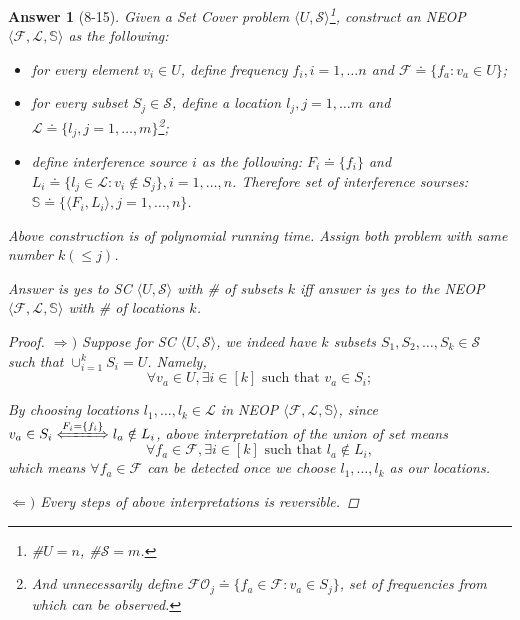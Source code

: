 \documentclass[11pt]{article}
\theoremstyle{numberplain}
\theoremstyle{nonumberplain}
\newtheorem{proof}{Proof}
\newtheorem{ans}{Answer}
\newcommand{\0}{{\mathbf{0}}}
\begin{document}
\begin{ans}[8-15] Given a Set Cover problem $\langle U, \mathcal{S}\rangle$\footnote{\#$U=n$, \#$\mathcal{S}=m$.}, construct an NEOP $\langle \mathcal{F}, \mathcal{L}, \mathbb{S}\rangle$ as the following:
\begin{itemize}
\item for every element $v_i\in U$, define frequency $f_i,i=1,\ldots n$ and $\mathcal{F}\doteq\{f_a:v_a\in U\}$; 
\item for every subset $S_j\in\mathcal{S}$, define a location $l_j,j=1,\ldots m$ and $\mathcal{L}\doteq \{l_j,j=1,\ldots, m \}$\footnote{And unnecessarily define $\mathcal{FO}_j\doteq\{ f_a\in \mathcal{F}:v_a\in S_j\}$, set of frequencies from which can be observed.};
\item define interference source $i$ as the following: $F_i\doteq \{f_i\}$ and $L_i\doteq\{l_j\in \mathcal{L}: v_i\notin S_j \}, i=1,\ldots, n$. Therefore set of interference sourses: $\mathbb{S}\doteq \{\langle F_i,L_i\rangle, j=1,\ldots, n\}$.
\end{itemize}
Above construction is of polynomial running time. Assign both problem with same number $k(\leq j)$.
\begin{State}[Claim 1] Answer is yes to SC $\langle U, \mathcal{S}\rangle$ with  \# of subsets $k$ iff answer is yes to the NEOP $\langle \mathcal{F}, \mathcal{L}, \mathbb{S}\rangle$ with \# of locations $k$.
\end{State}
\begin{proof}
$\Rightarrow )$ Suppose for SC $\langle U, \mathcal{S}\rangle$, we indeed have $k$ subsets $S_1,S_2,\ldots,S_k\in \mathcal{S}$ such that $\cup_{i=1}^k S_i=U$. Namely, 
$$\forall v_a\in U, \exists i\in [k]\text{ such that }v_a\in S_i;$$

By choosing locations $l_1,\ldots,l_k\in \mathcal{L}$ in  NEOP $\langle \mathcal{F}, \mathcal{L}, \mathbb{S}\rangle$, since $v_a\in S_i\xLongleftrightarrow{F_i=\{f_i\}} l_a \notin L_i$, above interpretation of the union of set means
$$\forall f_a\in \mathcal{F}, \exists i\in [k]\text{ such that }l_a\notin L_i,$$
which means $\forall f_a\in \mathcal{F}$ can be detected once we choose $l_1,\ldots, l_k$ as our locations.


$\Leftarrow )$ Every steps of above interpretations is reversible.
\end{proof}
\end{ans}
\end{document}

